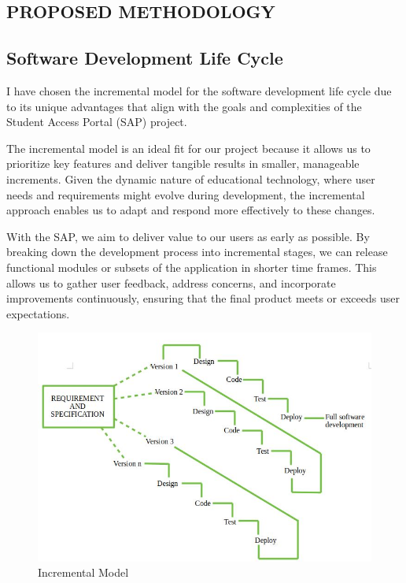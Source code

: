 \begin{center}
\section{PROPOSED METHODOLOGY}
\end{center}
\subsection{Software Development Life Cycle}
I have chosen the incremental model for the software development life cycle due to its unique advantages that align with the goals and complexities of the Student Access Portal (SAP) project.

The incremental model is an ideal fit for our project because it allows us to prioritize key features and deliver tangible results in smaller, manageable increments. Given the dynamic nature of educational technology, where user needs and requirements might evolve during development, the incremental approach enables us to adapt and respond more effectively to these changes.

With the SAP, we aim to deliver value to our users as early as possible. By breaking down the development process into incremental stages, we can release functional modules or subsets of the application in shorter time frames. This allows us to gather user feedback, address concerns, and incorporate improvements continuously, ensuring that the final product meets or exceeds user expectations.\\
\vspace{0.5in}
\begin{figure}[h]
    \centering
    \includegraphics[width = 5in]{Proposal/static/incremental.png}
    \caption{Incremental Model}
    \label{fig:enter-label}
\end{figure}
\newpage

